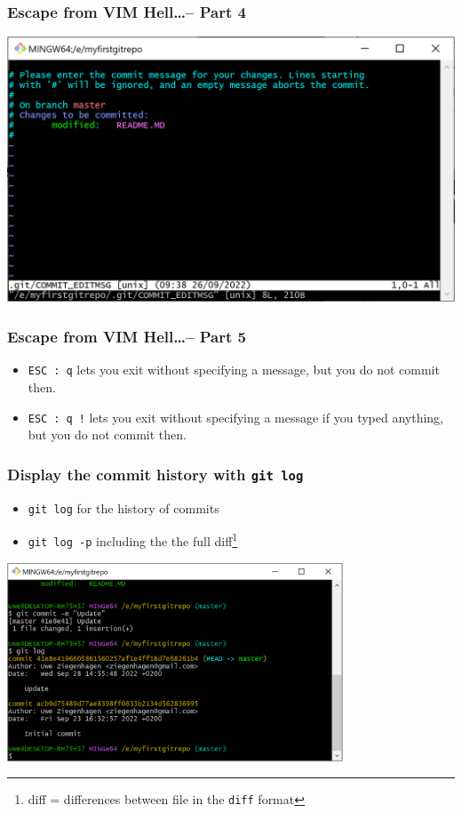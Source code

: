 \documentclass[12pt,english]{beamer}
\begin{document}
\begin{frame}
\frametitle{Escape from VIM Hell\ldots -- Part 4}

\includegraphics[width=\textwidth]{vim-hell}

\end{frame}

\begin{frame}
\frametitle{Escape from VIM Hell\ldots -- Part 5}

\begin{itemize}
\item \texttt{ESC}~\texttt{:}~\texttt{q} lets you exit without specifying a message, but you do not commit then.
\item \texttt{ESC}~\texttt{:}~\texttt{q}~\texttt{!} lets you exit without specifying a message if you typed anything, but you do not commit then.
\end{itemize}
\end{frame}

\begin{frame}
\frametitle{Display the commit history with \texttt{git log}}

\begin{itemize}
	\item \texttt{git log} for the history of commits
\item \texttt{git log -p} including the the full diff\footnote{diff = differences between file in the \texttt{diff} format}
\end{itemize}

\begin{center}
\includegraphics[width=0.75\textwidth]{gitlog}
\end{center}

\end{frame}
\end{document}

